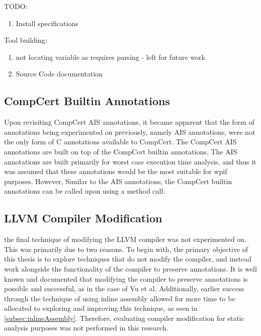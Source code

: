 TODO:
\begin{enumerate}
    \item Install specifications
\end{enumerate}

Tool building:
\begin{enumerate}
    \item not locating variable as requires parsing - left for future work
    \item Source Code documentation
\end{enumerate}

\subsection{CompCert Builtin Annotations}

Upon revisiting CompCert AIS annotations, it became apparent that the form of annotations being experimented on previously, namely AIS annotations, were not the only form of C annotations available to CompCert. The CompCert AIS annotations are built on top of the CompCert builtin annotations. The AIS annotations are built primarily for worst case execution time analysis, and thus it was assumed that these annotations would be the most suitable for wpif purposes. However,  Similar to the AIS annotations, the CompCert builtin annotations can be called upon using a method call.


\subsection{LLVM Compiler Modification}
the final technique of modifying the LLVM compiler was not experimented on. This was primarily due to two reasons. To begin with, the primary objective of this thesis is to explore techniques that do not modify the compiler, and instead work alongside the functionality of the compiler to preserve annotations. It is well known and documented that modifying the compiler to preserve annotations is possible and successful, as in the case of Vu et al. \cite{vu2020secure} Additionally, earlier success through the technique of using inline assembly allowed for more time to be allocated to exploring and improving this technique, as seen in \ref{subsec:inlineAssembly}. Therefore, evaluating compiler modification for static analysis purposes was not performed in this research.

